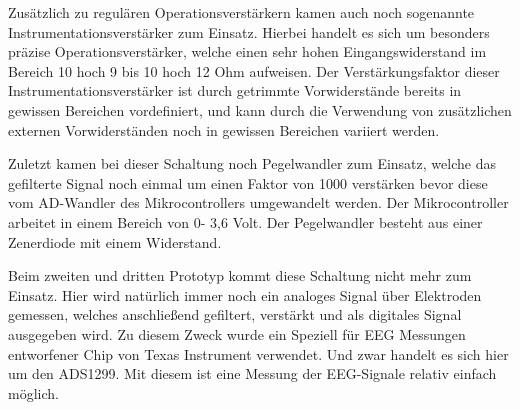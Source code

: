 Zusätzlich zu regulären Operationsverstärkern kamen auch noch sogenannte Instrumentationsverstärker zum Einsatz. Hierbei handelt es sich um besonders präzise Operationsverstärker, welche einen sehr hohen Eingangswiderstand im Bereich 10 hoch 9 bis 10 hoch 12 Ohm aufweisen. Der Verstärkungsfaktor dieser Instrumentationsverstärker ist durch getrimmte Vorwiderstände bereits in gewissen Bereichen vordefiniert, und kann durch die Verwendung von zusätzlichen externen Vorwiderständen noch in gewissen Bereichen variiert werden.

Zuletzt kamen bei dieser Schaltung noch Pegelwandler zum Einsatz, welche das gefilterte Signal noch einmal um einen Faktor von 1000 verstärken bevor diese vom AD-Wandler des Mikrocontrollers umgewandelt werden. Der Mikrocontroller arbeitet in einem Bereich von 0- 3,6 Volt. Der Pegelwandler besteht aus einer Zenerdiode mit einem Widerstand.

Beim zweiten und dritten Prototyp kommt diese Schaltung nicht mehr zum Einsatz. Hier wird natürlich immer noch ein analoges Signal über Elektroden gemessen, welches anschließend gefiltert, verstärkt und als digitales Signal ausgegeben wird. Zu diesem Zweck wurde ein Speziell für EEG Messungen entworfener Chip von Texas Instrument verwendet. Und zwar handelt es sich hier um den ADS1299. Mit diesem ist eine Messung der EEG-Signale relativ einfach möglich.


